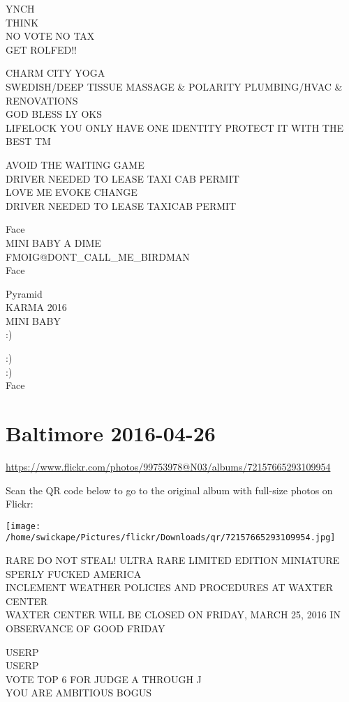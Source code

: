 \documentclass[10pt,letterpaper]{article}
\begin{document}
YNCH\\
THINK\\
NO VOTE NO TAX\\
GET ROLFED!!

CHARM CITY YOGA\\
SWEDISH/DEEP TISSUE MASSAGE \& POLARITY PLUMBING/HVAC \& RENOVATIONS\\
GOD BLESS LY OKS\\
LIFELOCK YOU ONLY HAVE ONE IDENTITY PROTECT IT WITH THE BEST TM

AVOID THE WAITING GAME\\
DRIVER NEEDED TO LEASE TAXI CAB PERMIT\\
LOVE ME EVOKE CHANGE\\
DRIVER NEEDED TO LEASE TAXICAB PERMIT

Face\\
MINI BABY A DIME\\
FMOIG@DONT\_CALL\_ME\_BIRDMAN\\
Face

Pyramid\\
KARMA 2016\\
MINI BABY\\
:)

:)\\
:)\\
Face


\section*{Baltimore 2016-04-26}

\url{https://www.flickr.com/photos/99753978@N03/albums/72157665293109954}

Scan the QR code below to go to the original album with full-size photos on Flickr:

\texttt{[image: /home/swickape/Pictures/flickr/Downloads/qr/72157665293109954.jpg]}


RARE DO NOT STEAL!  ULTRA RARE LIMITED EDITION MINIATURE\\
SPERLY FUCKED AMERICA\\
INCLEMENT WEATHER POLICIES AND PROCEDURES AT WAXTER CENTER\\
WAXTER CENTER WILL BE CLOSED ON FRIDAY, MARCH 25, 2016 IN OBSERVANCE OF GOOD FRIDAY

USERP\\
USERP\\
VOTE TOP 6 FOR JUDGE A THROUGH J\\
YOU ARE AMBITIOUS BOGUS
\end{document}
